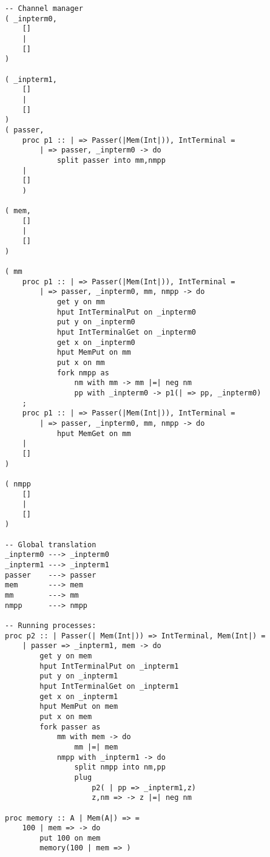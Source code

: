 \documentclass{article}
\theoremstyle{plain}%
\theoremstyle{definition}
\theoremstyle{remark}
\begin{document}
\begin{verbatim}
-- Channel manager
( _inpterm0,  
    []
    |
    []
)

( _inpterm1,  
    []
    |
    []
)
( passer,
    proc p1 :: | => Passer(|Mem(Int|)), IntTerminal = 
        | => passer, _inpterm0 -> do
            split passer into mm,nmpp 
    |
    []
    )

( mem,
    []
    |
    []
)

( mm
    proc p1 :: | => Passer(|Mem(Int|)), IntTerminal = 
        | => passer, _inpterm0, mm, nmpp -> do
            get y on mm
            hput IntTerminalPut on _inpterm0
            put y on _inpterm0
            hput IntTerminalGet on _inpterm0
            get x on _inpterm0
            hput MemPut on mm
            put x on mm
            fork nmpp as
                nm with mm -> mm |=| neg nm 
                pp with _inpterm0 -> p1(| => pp, _inpterm0)
    ;
    proc p1 :: | => Passer(|Mem(Int|)), IntTerminal = 
        | => passer, _inpterm0, mm, nmpp -> do
            hput MemGet on mm 
    |
    []
)

( nmpp
    []
    |
    []
)

-- Global translation
_inpterm0 ---> _inpterm0 
_inpterm1 ---> _inpterm1 
passer    ---> passer 
mem       ---> mem
mm        ---> mm
nmpp      ---> nmpp

-- Running processes:
proc p2 :: | Passer(| Mem(Int|)) => IntTerminal, Mem(Int|) =
    | passer => _inpterm1, mem -> do
        get y on mem
        hput IntTerminalPut on _inpterm1
        put y on _inpterm1
        hput IntTerminalGet on _inpterm1
        get x on _inpterm1
        hput MemPut on mem
        put x on mem
        fork passer as
            mm with mem -> do
                mm |=| mem
            nmpp with _inpterm1 -> do
                split nmpp into nm,pp
                plug
                    p2( | pp => _inpterm1,z)
                    z,nm => -> z |=| neg nm

proc memory :: A | Mem(A|) => =
    100 | mem => -> do
        put 100 on mem
        memory(100 | mem => )
\end{verbatim}
\end{document}
